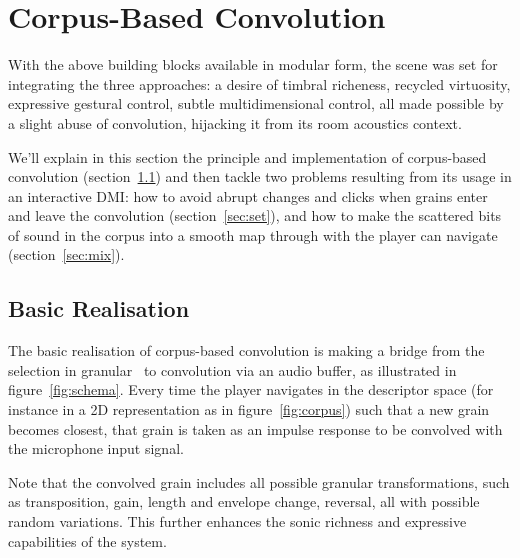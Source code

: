 \section{Corpus-Based Convolution} %

With the above building blocks available in modular form, the scene was set for integrating the three approaches: a desire of timbral richeness, recycled virtuosity, expressive gestural control, subtle multidimensional control, all made possible by a slight abuse of convolution, hijacking it from its room acoustics context.

We'll explain in this section the principle and implementation of corpus-based convolution (section~\ref{sec:basic}) and then tackle two problems resulting from its usage in an interactive DMI: 
how to avoid abrupt changes and clicks when grains enter and leave the convolution (section~\ref{sec:set}), and
how to make the scattered bits of sound in the corpus into a smooth map through with the player can navigate (section~\ref{sec:mix}).

\subsection{Basic Realisation}\label{sec:basic}


The basic realisation of corpus-based convolution is making a bridge from the selection in granular \cbcs\ to convolution via an audio buffer, as illustrated in figure~\ref{fig:schema}.  Every time the player navigates in the descriptor space (for instance in a 2D representation as in figure~\ref{fig:corpus}) such that a new grain becomes closest, that grain is taken as an impulse response to be convolved with the microphone input signal.

Note that the convolved grain includes all possible granular transformations, such as transposition, gain, length and envelope change, reversal, all with possible random variations.
This further enhances the sonic richness and expressive capabilities of the system.

